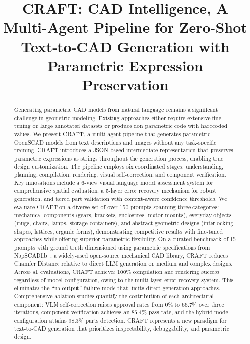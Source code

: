 \documentclass[5p,twocolumn,10pt,times]{elsarticle}
\begin{document}
\baselineskip11pt

\begin{frontmatter}

\title{CRAFT: CAD Intelligence, A Multi-Agent Pipeline for Zero-Shot Text-to-CAD Generation with Parametric Expression Preservation}





\begin{abstract} 
Generating parametric CAD models from natural language remains a significant challenge in geometric modeling. Existing approaches either require extensive fine-tuning on large annotated datasets or produce non-parametric code with hardcoded values. We present CRAFT, a multi-agent pipeline that generates parametric OpenSCAD models from text descriptions and images without any task-specific training. CRAFT introduces a JSON-based intermediate representation that preserves parametric expressions as strings throughout the generation process, enabling true design customization. The pipeline employs six coordinated stages: understanding, planning, compilation, rendering, visual self-correction, and component verification. Key innovations include a 6-view visual language model assessment system for comprehensive spatial evaluation, a 5-layer error recovery mechanism for robust generation, and tiered part validation with context-aware confidence thresholds. We evaluate CRAFT on a diverse set of over 150 prompts spanning three categories: mechanical components (gears, brackets, enclosures, motor mounts), everyday objects (mugs, chairs, lamps, storage containers), and abstract geometric designs (interlocking shapes, lattices, organic forms), demonstrating competitive results with fine-tuned approaches while offering superior parametric flexibility. On a curated benchmark of 15 prompts with ground truth dimensioned using parametric specifications from NopSCADlib~\cite{nopscadlib}, a widely-used open-source mechanical CAD library, CRAFT reduces Chamfer Distance relative to direct LLM generation on medium and complex designs. Across all evaluations, CRAFT achieves 100\% compilation and rendering success regardless of model configuration, owing to the multi-layer error recovery system. This eliminates the ``no output'' failure mode that limits direct generation approaches. Comprehensive ablation studies quantify the contribution of each architectural component: VLM self-correction raises approval rates from 0\% to 66.7\% over three iterations, component verification achieves an 86.4\% pass rate, and the hybrid model configuration attains 98.3\% parts detection. CRAFT represents a new paradigm for text-to-CAD generation that prioritizes inspectability, debuggability, and parametric design.
\end{abstract}


\end{frontmatter}
\end{document}
